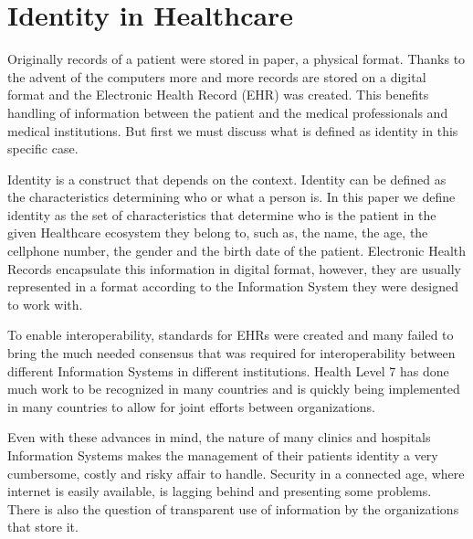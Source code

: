\section{Identity in Healthcare}

Originally records of a patient were stored in paper, a physical format.
Thanks to the advent of the computers more and more records are stored on a
digital format and the Electronic Health Record (EHR) was created.
\cite{Marquez2017}  This benefits handling of information between the patient
and the medical professionals and medical institutions.\cite{ONCoordinator2017}
But first we must discuss what is defined as identity in this specific case.

Identity is a construct that depends on the context.  Identity can be defined
as the characteristics determining who or what a person is.  In this paper we
define identity as the set of characteristics that determine who is the patient
in the given Healthcare ecosystem they belong to, such as, the name, the age,
the cellphone number, the gender and the birth date of the patient.  Electronic
Health Records encapsulate this information in digital format, however, they
are usually represented in a format according to the Information System they
were designed to work with.

To enable interoperability, standards for EHRs were created and many failed to
bring the much needed consensus that was required for interoperability between
different Information Systems in different institutions.  \cite{Eichelberg2006}
Health Level 7 has done much work to be recognized in many countries and is
quickly being implemented in many countries to allow for joint efforts between
organizations. \cite{HL7Anual2016}

Even with these advances in mind, the nature of many clinics and hospitals
Information Systems makes the management of their patients identity a very
cumbersome, costly and risky affair to handle.  Security in a connected age,
where internet is easily available, is lagging behind and presenting some
problems.  There is also the question of transparent use of information by the
organizations that store it.
